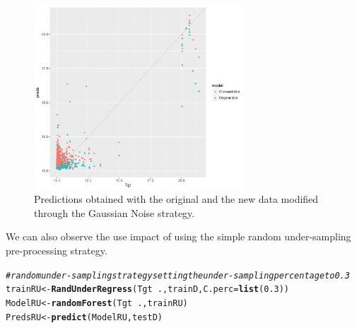 \documentclass[10pt,a4paper]{article}\usepackage[]{graphicx}\usepackage[]{color}
\makeatletter
\newcommand{\hlnum}[1]{\textcolor[rgb]{0.686,0.059,0.569}{#1}}%
\newcommand{\hlcom}[1]{\textcolor[rgb]{0.678,0.584,0.686}{\textit{#1}}}%
\newcommand{\hlopt}[1]{\textcolor[rgb]{0,0,0}{#1}}%
\newcommand{\hlstd}[1]{\textcolor[rgb]{0.345,0.345,0.345}{#1}}%
\newcommand{\hlkwb}[1]{\textcolor[rgb]{0.69,0.353,0.396}{#1}}%
\newcommand{\hlkwc}[1]{\textcolor[rgb]{0.333,0.667,0.333}{#1}}%
\newcommand{\hlkwd}[1]{\textcolor[rgb]{0.737,0.353,0.396}{\textbf{#1}}}%
\newenvironment{kframe}{%
 \def\at@end@of@kframe{}%
 \ifinner\ifhmode%
  \def\at@end@of@kframe{\end{minipage}}%
  \begin{minipage}{\columnwidth}%
 \fi\fi%
 \def\FrameCommand##1{\hskip\@totalleftmargin \hskip-\fboxsep
 \colorbox{shadecolor}{##1}\hskip-\fboxsep
     \hskip-\linewidth \hskip-\@totalleftmargin \hskip\columnwidth}%
 \MakeFramed {\advance\hsize-\width
   \@totalleftmargin\z@ \linewidth\hsize
   \@setminipage}}%
 {\par\unskip\endMakeFramed%
 \at@end@of@kframe}
\newenvironment{knitrout}{}{} %
\makeatother
\begin{document}
\begin{knitrout}\footnotesize
{}\color{fgcolor}\begin{figure}

{\centering \includegraphics[width=0.7\textwidth]{figures/UBL-ImbR_RF1-1} 

}

\caption[Predictions obtained with the original and the new data modified through the Gaussian Noise strategy]{Predictions obtained with the original and the new data modified through the Gaussian Noise strategy.}\label{fig:ImbR_RF1}
\end{figure}


\end{knitrout}


We can also observe the use impact of using the simple random under-sampling pre-processing strategy.

\begin{knitrout}\footnotesize
{}\color{fgcolor}\begin{kframe}
\begin{alltt}
\hlcom{# random under-sampling strategy setting the under-sampling percentage to 0.3}
\hlstd{trainRU} \hlkwb{<-}\hlkwd{RandUnderRegress}\hlstd{(Tgt}\hlopt{~}\hlstd{., trainD,} \hlkwc{C.perc}\hlstd{=}\hlkwd{list}\hlstd{(}\hlnum{0.3}\hlstd{))}
\hlstd{ModelRU} \hlkwb{<-}\hlkwd{randomForest}\hlstd{(Tgt}\hlopt{~}\hlstd{., trainRU)}
\hlstd{PredsRU} \hlkwb{<-} \hlkwd{predict}\hlstd{(ModelRU, testD)}
\end{alltt}
\end{kframe}
\end{knitrout}
\end{document}
